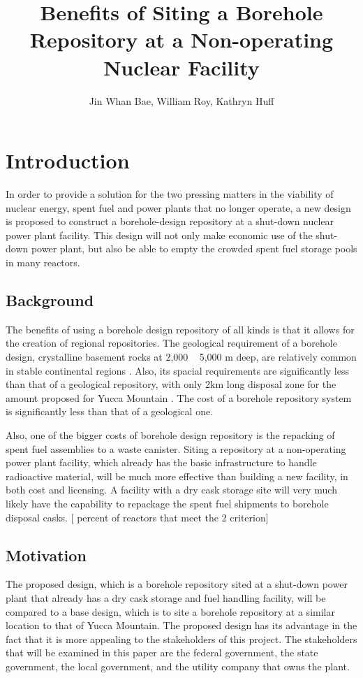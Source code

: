 \documentclass{anstrans}
\title{Benefits of Siting a Borehole Repository at a Non-operating Nuclear 
Facility}
\author{Jin Whan Bae, William Roy, Kathryn Huff}
\institute{
Dept. of Nuclear Plasma, and Radiological Engineering, University of Illinois at Urbana-Champaign
\and
Urbana, IL
}
\begin{document}
\section{Introduction}

In order to provide a solution for the two pressing matters in the viability of
nuclear energy, spent fuel and power plants that no longer operate, a new
design is proposed to construct a borehole-design repository at a shut-down
nuclear power plant facility. This design will not only make economic use of
the shut-down power plant, but also be able to empty the crowded spent fuel
storage pools in many reactors.



\subsection{Background}

The benefits of using a borehole design repository of all kinds is that it 
allows for the creation of regional repositories. The geological requirement of 
a borehole design, crystalline basement rocks at 2,000 ~ 5,000 m deep, are 
relatively common in stable continental regions \cite{arnold_research_2012}.  
Also, its spacial requirements are significantly less than that of a geological 
repository, with only 2km long disposal zone for the amount proposed for Yucca 
Mountain \cite{brady_deep_2009}. The cost of a borehole repository system is 
significantly less than that of a geological one. 

Also, one of the bigger costs of borehole design repository is the repacking of 
spent fuel assemblies to a waste canister. Siting a repository at a non-operating power 
plant facility, which already has the basic infrastructure to handle 
radioactive material, will be much more effective than building a new facility, 
in both cost and licensing. A facility with a dry cask storage site will very 
much likely have the capability to repackage the spent fuel shipments to 
borehole disposal casks. [ percent of reactors that meet the 2 criterion]

\subsection{Motivation}

The proposed design, which is a borehole repository sited at a shut-down power
plant that already has a dry cask storage and fuel handling facility, will be
 compared to a base design, which is to site a borehole repository 
at a similar location to that of Yucca Mountain. The proposed design has its 
advantage in the fact that it is more appealing to the stakeholders of this 
project. The stakeholders that will be examined in this paper are the federal 
government, the state government, the local government, and the utility company 
that owns the plant.
\end{document}
